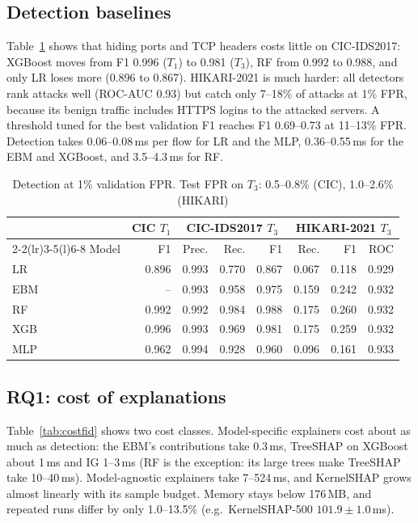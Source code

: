 \documentclass[pdflatex,iicol,sn-mathphys-num]{sn-jnl}
\begin{document}
\subsection{Detection baselines}
Table~\ref{tab:det} shows that hiding ports and TCP headers costs little on CIC-IDS2017: XGBoost moves from F1 0.996 ($T_1$) to 0.981 ($T_3$), RF from 0.992 to 0.988, and only LR loses more (0.896 to 0.867). HIKARI-2021 is much harder: all detectors rank attacks well (ROC-AUC 0.93) but catch only 7--18\% of attacks at 1\% FPR, because its benign traffic includes HTTPS logins to the attacked servers. A threshold tuned for the best validation F1 reaches F1 0.69--0.73 at 11--13\% FPR. Detection takes 0.06--0.08\,ms per flow for LR and the MLP, 0.36--0.55\,ms for the EBM and XGBoost, and 3.5--4.3\,ms for RF.

\begin{table}[!t]
\caption{Detection at 1\% validation FPR. Test FPR on $T_3$: 0.5--0.8\% (CIC), 1.0--2.6\% (HIKARI)}\label{tab:det}
\setlength{\tabcolsep}{1.5pt}
\begin{tabular*}{\columnwidth}{@{\extracolsep\fill}lrrrrrrr@{}}
\toprule
 & \multicolumn{1}{c}{CIC $T_1$} & \multicolumn{3}{c}{CIC-IDS2017 $T_3$} & \multicolumn{3}{c}{HIKARI-2021 $T_3$} \\
\cmidrule(lr){2-2}\cmidrule(lr){3-5}\cmidrule(l){6-8}
Model & F1 & Prec. & Rec. & F1 & Rec. & F1 & ROC \\
\midrule
LR & 0.896 & 0.993 & 0.770 & 0.867 & 0.067 & 0.118 & 0.929 \\
EBM & -- & 0.993 & 0.958 & 0.975 & 0.159 & 0.242 & 0.932 \\
RF & 0.992 & 0.992 & 0.984 & 0.988 & 0.175 & 0.260 & 0.932 \\
XGB & 0.996 & 0.993 & 0.969 & 0.981 & 0.175 & 0.259 & 0.932 \\
MLP & 0.962 & 0.994 & 0.928 & 0.960 & 0.096 & 0.161 & 0.933 \\
\bottomrule
\end{tabular*}
\end{table}

\subsection{RQ1: cost of explanations}
Table~\ref{tab:costfid} shows two cost classes. Model-specific explainers cost about as much as detection: the EBM's contributions take 0.3\,ms, TreeSHAP on XGBoost about 1\,ms and IG 1--3\,ms (RF is the exception: its large trees make TreeSHAP take 10--40\,ms). Model-agnostic explainers take 7--524\,ms, and KernelSHAP grows almost linearly with its sample budget. Memory stays below 176\,MB, and repeated runs differ by only 1.0--13.5\% (e.g.\ KernelSHAP-500 $101.9\pm1.0$\,ms).
\end{document}
